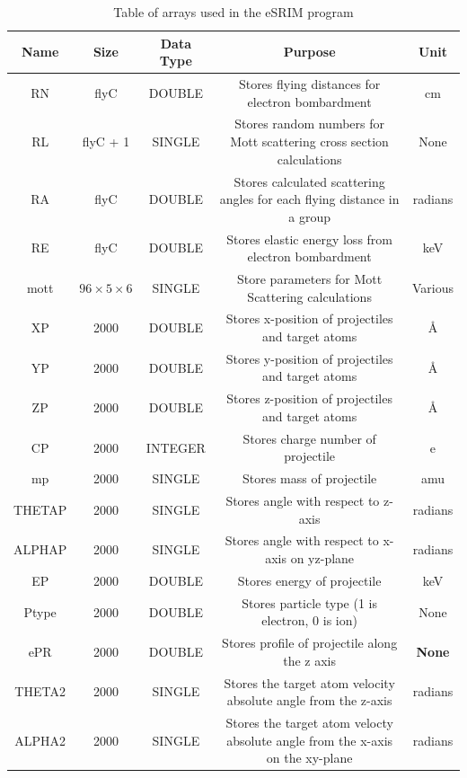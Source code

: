 \documentclass[10pt, reqno]{exam}
\begin{document}
\begin{table}[h]
    \centering
    \caption{Table of arrays used in the eSRIM program}
    \footnotesize
    \begin{tabular}{|c|c|c|c|c|}
        \hline
        Name & Size & Data Type & Purpose & Unit \\
        \hline
        RN  & flyC & DOUBLE & Stores flying distances for electron bombardment & \si{cm} \\
        RL  & flyC + 1 & SINGLE & Stores random numbers for Mott scattering cross section calculations & None \\
        RA  & flyC & DOUBLE & Stores calculated scattering angles for each flying distance in a group & radians \\
        RE  & flyC & DOUBLE & Stores elastic energy loss from electron bombardment & keV \\
        mott & $96\times 5\times 6$ & SINGLE & Store parameters for Mott Scattering calculations & Various \\
        XP & 2000 & DOUBLE & Stores x-position of projectiles and target atoms & \si{\angstrom} \\
        YP & 2000 & DOUBLE & Stores y-position of projectiles and target atoms & \si{\angstrom} \\
        ZP & 2000 & DOUBLE & Stores z-position of projectiles and target atoms & \si{\angstrom} \\
        CP & 2000 & INTEGER & Stores charge number of projectile & e \\
        mp & 2000 & SINGLE & Stores mass of projectile & amu \\
        THETAP & 2000 & SINGLE & Stores angle with respect to z-axis & radians \\
        ALPHAP & 2000 & SINGLE & Stores angle with respect to x-axis on yz-plane & radians \\
        EP & 2000 & DOUBLE & Stores energy of projectile & keV \\
        Ptype & 2000 & DOUBLE & Stores particle type (1 is electron, 0 is ion) & None \\
        ePR & 2000 & DOUBLE & Stores profile of projectile along the z axis & \textbf{None} \\
        THETA2 & 2000 & SINGLE & Stores the target atom velocity absolute angle from the z-axis & radians \\
        ALPHA2 & 2000 & SINGLE & Stores the target atom velocty absolute angle from the x-axis on the xy-plane & radians \\

\end{tabular}
\end{table}
\end{document}
